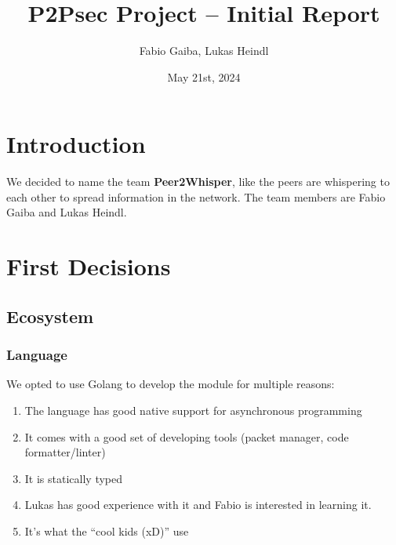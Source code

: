 \documentclass[a4paper,english,10pt,NET]{tumarticle}
\title{P2Psec Project -- Initial Report}
\author{Fabio Gaiba, Lukas Heindl}
\date{May 21st, 2024}
\begin{document}
\maketitle
\thispagestyle{tumarticle}

\section{Introduction}

We decided to name the team \textbf{Peer2Whisper}, like the peers are whispering to each other to spread information in the network. The team members are Fabio Gaiba and Lukas Heindl.




\section{First Decisions}
\subsection{Ecosystem}
\subsubsection{Language}

We opted to use Golang to develop the module for multiple reasons:

\begin{enumerate}
	\item The language has good native support for asynchronous programming 
	\item It comes with a good set of developing tools (packet manager, code formatter/linter)
	\item It is statically typed  
	\item Lukas has good experience with it and Fabio is interested in learning it.
	\item It's what the \enquote{cool kids (xD)} use
\end{enumerate}

\end{document}
